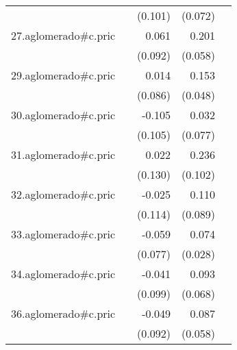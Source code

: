 {\begin{longtable}{l*{4}{D{.}{.}{-1}}}
            &                     &     (0.101)         &     (0.072)         &                     \\
\addlinespace
27.aglomerado#c.pric&                     &       0.061         &       0.201\sym{***}&                     \\
            &                     &     (0.092)         &     (0.058)         &                     \\
\addlinespace
29.aglomerado#c.pric&                     &       0.014         &       0.153\sym{**} &                     \\
            &                     &     (0.086)         &     (0.048)         &                     \\
\addlinespace
30.aglomerado#c.pric&                     &      -0.105         &       0.032         &                     \\
            &                     &     (0.105)         &     (0.077)         &                     \\
\addlinespace
31.aglomerado#c.pric&                     &       0.022         &       0.236\sym{*}  &                     \\
            &                     &     (0.130)         &     (0.102)         &                     \\
\addlinespace
32.aglomerado#c.pric&                     &      -0.025         &       0.110         &                     \\
            &                     &     (0.114)         &     (0.089)         &                     \\
\addlinespace
33.aglomerado#c.pric&                     &      -0.059         &       0.074\sym{**} &                     \\
            &                     &     (0.077)         &     (0.028)         &                     \\
\addlinespace
34.aglomerado#c.pric&                     &      -0.041         &       0.093         &                     \\
            &                     &     (0.099)         &     (0.068)         &                     \\
\addlinespace
36.aglomerado#c.pric&                     &      -0.049         &       0.087         &                     \\
            &                     &     (0.092)         &     (0.058)         &                     \\

\end{longtable}}
